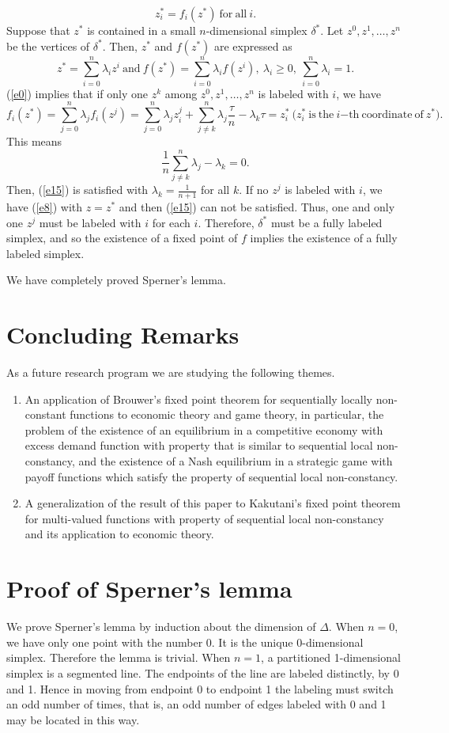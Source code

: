 \documentclass[reqno]{amsart}
\begin{document}
\begin{equation}
z^*_i=f_i(z^*)\ \mathrm{for\ all}\ i.\label{e15}
\end{equation}
Suppose that $z^*$ is contained in a small $n$-dimensional simplex $\delta^*$. Let $z^0, z^1, \dots, z^n$ be the vertices of $\delta^*$. Then, $z^*$ and $f(z^*)$ are expressed as
\[z^*=\sum_{i=0}^n\lambda_iz^i\ \mathrm{and}\ f(z^*)=\sum_{i=0}^n\lambda_if(z^i),\ \lambda_i\geq 0,\ \sum_{i=0}^n\lambda_i=1.\]
(\ref{e0}) implies that if only one $z^k$ among $z^0, z^1, \dots, z^n$ is labeled with $i$, we have
\[f_i(z^*)=\sum_{j=0}^n\lambda_jf_i(z^j)=\sum_{j=0}^n\lambda_jz_i^j+\sum_{j\neq k}^n\lambda_j\frac{\tau}{n}-\lambda_k\tau=z_i^*\ \mathrm{(}z_i^*\mathrm{\ is\ the}\ i\mathrm{-th\ coordinate\ of}\ z^*\mathrm{)}.\]
This means
\[\frac{1}{n}\sum_{j\neq k}^n\lambda_j-\lambda_k=0.\]
Then, (\ref{e15}) is satisfied with $\lambda_k=\frac{1}{n+1}$ for all $k$. If no $z^j$ is labeled with $i$, we have (\ref{e8}) with $z=z^*$ and then (\ref{e15}) can not be satisfied. Thus, one and only one $z^j$ must be labeled with $i$ for each $i$. Therefore, $\delta^*$ must be a fully labeled simplex, and so the existence of a fixed point of $f$ implies the existence of a fully labeled simplex.

We have completely proved Sperner's lemma.

\section{Concluding Remarks}

As a future research program we are studying the following themes.
\begin{enumerate}
	\item An application of Brouwer's fixed point theorem for sequentially locally non-constant functions to economic theory and game theory, in particular, the problem of the existence of an equilibrium in a competitive economy with excess demand function with property that is similar to sequential local non-constancy, and the existence of a Nash equilibrium in a strategic game with payoff functions which satisfy the property of sequential local non-constancy.
	\item A generalization of the result of this paper to Kakutani's fixed point theorem for multi-valued functions with property of sequential local non-constancy and its application to economic theory.
\end{enumerate}

\appendix
\section{Proof of Sperner's lemma}\label{app1}
We prove Sperner's lemma by induction about the dimension of $\Delta$. When $n=0$, we have only one point with the number 0. It is the unique 0-dimensional simplex. Therefore the lemma is trivial. When $n=1$, a partitioned 1-dimensional simplex is a segmented line. The endpoints of the line are labeled distinctly, by 0 and 1. Hence in moving from endpoint 0 to endpoint 1 the labeling must switch an odd number of times, that is, an odd number of edges labeled with 0 and 1 may be located in this way.
\end{document}
